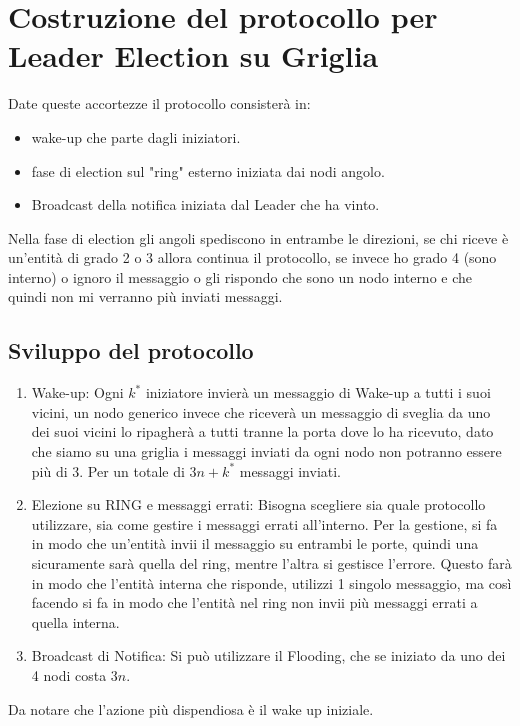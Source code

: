 \section{Costruzione del protocollo per Leader Election su Griglia}
Date queste accortezze il protocollo consisterà in:
\begin{itemize}
    \item wake-up che parte dagli iniziatori.
    \item fase di election sul "ring" esterno iniziata dai nodi angolo.
    \item Broadcast della notifica iniziata dal Leader che ha vinto.
\end{itemize}
Nella fase di election gli angoli spediscono in entrambe le direzioni, se chi riceve è un'entità di grado 2 o 3 allora continua il protocollo, se invece ho grado 4 (sono interno) o ignoro il messaggio o gli rispondo che sono un nodo interno e che quindi non mi verranno più inviati messaggi.\\
\subsection{Sviluppo del protocollo}
\begin{enumerate}
    \item Wake-up: Ogni $k^*$ iniziatore invierà un messaggio di Wake-up a tutti i suoi vicini, un nodo generico invece che riceverà un messaggio di sveglia da uno dei suoi vicini lo ripagherà a tutti tranne la porta dove lo ha ricevuto, dato che siamo su una griglia i messaggi inviati da ogni nodo non potranno essere più di 3. Per un totale di $3n +k^*$ messaggi inviati.
    \item Elezione su RING e messaggi errati: Bisogna scegliere sia quale protocollo utilizzare, sia come gestire i messaggi errati all'interno. Per la gestione, si fa in modo che un'entità invii il messaggio su entrambi le porte, quindi una sicuramente sarà quella del ring, mentre l'altra si gestisce l'errore. Questo farà in modo che l'entità interna che risponde, utilizzi 1 singolo messaggio, ma così facendo si fa in modo che l'entità nel ring non invii più messaggi errati a quella interna.
    \item Broadcast di Notifica: Si può utilizzare il Flooding, che se iniziato da uno dei 4 nodi costa $3n$.
\end{enumerate}
Da notare che l'azione più dispendiosa è il wake up iniziale.

